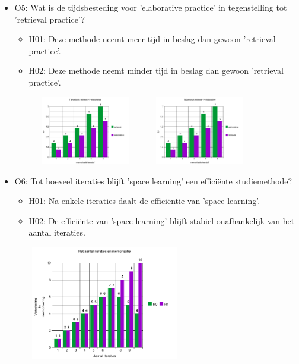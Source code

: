 \documentclass{article}
\begin{document}
\begin{itemize}
\item O5: Wat is de tijdsbesteding voor 'elaborative practice' in tegenstelling tot 'retrieval practice'?
\begin{itemize}
\item H01: Deze methode neemt meer tijd in beslag dan gewoon 'retrieval practice'.
\item H02: Deze methode neemt minder tijd in beslag dan gewoon 'retrieval practice'.\\
\begin{center}
	\includegraphics[width=5cm, height=3cm]{O5-H1}
	\includegraphics[width=5cm, height=3cm]{O5-H2}
\end{center}
\end{itemize}
\newpage
\item O6: Tot hoeveel iteraties blijft 'space learning' een efficiënte studiemethode?
\begin{itemize}
	\item H01: Na enkele iteraties daalt de efficiëntie van 'space learning'.
	\item H02: De efficiënte van 'space learning' blijft stabiel onafhankelijk van het aantal iteraties.
\end{itemize}
\begin{center}
	\includegraphics[width=8cm, height=5cm]{O6}
\end{center}
\end{itemize}
\end{document}
